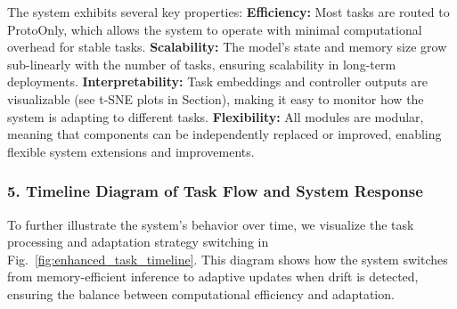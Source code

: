 \documentclass[conference]{IEEEtran}
\begin{document}
The system exhibits several key properties:
\textbf{Efficiency:} Most tasks are routed to ProtoOnly, which allows the system to operate with minimal computational overhead for stable tasks.
\textbf{Scalability:} The model’s state and memory size grow sub-linearly with the number of tasks, ensuring scalability in long-term deployments.
\textbf{Interpretability:} Task embeddings and controller outputs are visualizable (see t-SNE plots in Section), making it easy to monitor how the system is adapting to different tasks.
\textbf{Flexibility:} All modules are modular, meaning that components can be independently replaced or improved, enabling flexible system extensions and improvements.

\subsubsection*{5. Timeline Diagram of Task Flow and System Response}

To further illustrate the system’s behavior over time, we visualize the task processing and adaptation strategy switching in Fig.~\ref{fig:enhanced_task_timeline}. This diagram shows how the system switches from memory-efficient inference to adaptive updates when drift is detected, ensuring the balance between computational efficiency and adaptation.
\end{document}
